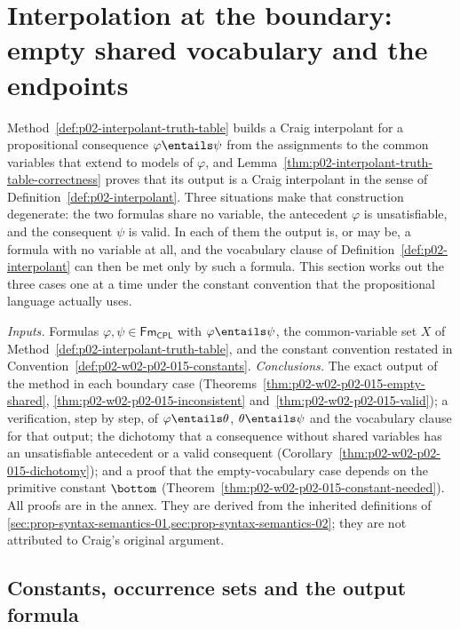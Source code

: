 \section{Interpolation at the boundary: empty shared vocabulary and the endpoints}
\label{sec:p02-w02-p02-015-interpolation-boundary}

Method~\ref{def:p02-interpolant-truth-table} builds a Craig interpolant for a
propositional consequence \(\varphi\entails\psi\) from the assignments to the
common variables that extend to models of \(\varphi\), and
Lemma~\ref{thm:p02-interpolant-truth-table-correctness} proves that its output
is a Craig interpolant in the sense of Definition~\ref{def:p02-interpolant}.
Three situations make that construction degenerate: the two formulas share no
variable, the antecedent \(\varphi\) is unsatisfiable, and the consequent
\(\psi\) is valid.  In each of them the output is, or may be, a formula with no
variable at all, and the vocabulary clause of
Definition~\ref{def:p02-interpolant} can then be met only by such a formula.
This section works out the three cases one at a time under the constant
convention that the propositional language actually uses.

\emph{Inputs.} Formulas \(\varphi,\psi\in\mathsf{Fm}_{\mathsf{CPL}}\) with
\(\varphi\entails\psi\), the common-variable set \(X\) of
Method~\ref{def:p02-interpolant-truth-table}, and the constant convention
restated in Convention~\ref{def:p02-w02-p02-015-constants}.
\emph{Conclusions.} The exact output of the method in each boundary case
(Theorems~\ref{thm:p02-w02-p02-015-empty-shared},
\ref{thm:p02-w02-p02-015-inconsistent} and~\ref{thm:p02-w02-p02-015-valid});
a verification, step by step, of \(\varphi\entails\theta\),
\(\theta\entails\psi\) and the vocabulary clause for that output; the
dichotomy that a consequence without shared variables has an unsatisfiable
antecedent or a valid consequent
(Corollary~\ref{thm:p02-w02-p02-015-dichotomy}); and a proof that the
empty-vocabulary case depends on the primitive constant \(\bottom\)
(Theorem~\ref{thm:p02-w02-p02-015-constant-needed}).
All proofs are in the annex.  They are derived from the inherited definitions
of \cref{sec:prop-syntax-semantics-01,sec:prop-syntax-semantics-02}; they are
not attributed to Craig's original argument.

\subsection{Constants, occurrence sets and the output formula}
\label{sec:p02-w02-p02-015-constants}

